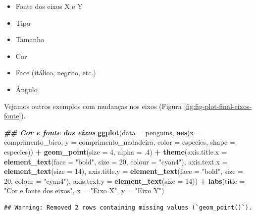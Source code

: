 \documentclass[
]{article}
\newenvironment{Shaded}{\begin{snugshade}}{\end{snugshade}}
\newcommand{\AttributeTok}[1]{\textcolor[rgb]{0.13,0.29,0.53}{#1}}
\newcommand{\DecValTok}[1]{\textcolor[rgb]{0.00,0.00,0.81}{#1}}
\newcommand{\DocumentationTok}[1]{\textcolor[rgb]{0.56,0.35,0.01}{\textbf{\textit{#1}}}}
\newcommand{\FunctionTok}[1]{\textcolor[rgb]{0.13,0.29,0.53}{\textbf{#1}}}
\newcommand{\NormalTok}[1]{#1}
\newcommand{\SpecialCharTok}[1]{\textcolor[rgb]{0.81,0.36,0.00}{\textbf{#1}}}
\newcommand{\StringTok}[1]{\textcolor[rgb]{0.31,0.60,0.02}{#1}}
\providecommand{\tightlist}{%
  \setlength{\itemsep}{0pt}\setlength{\parskip}{0pt}}
\begin{document}
\begin{itemize}
\tightlist
\item
  Fonte dos eixos X e Y
\item
  Tipo
\item
  Tamanho
\item
  Cor
\item
  Face (itálico, negrito, etc.)
\item
  Ângulo
\end{itemize}

Vejamos outros exemplos com mudanças nos eixos (Figura \ref{fig:fig-plot-final-eixos-fonte}).

\begin{Shaded}
\begin{Highlighting}[]
\DocumentationTok{\#\# Cor e fonte dos eixos}
\FunctionTok{ggplot}\NormalTok{(}\AttributeTok{data =}\NormalTok{ penguins, }
       \FunctionTok{aes}\NormalTok{(}\AttributeTok{x =}\NormalTok{ comprimento\_bico, }\AttributeTok{y =}\NormalTok{ comprimento\_nadadeira,}
           \AttributeTok{color =}\NormalTok{ especies, }\AttributeTok{shape =}\NormalTok{ especies)) }\SpecialCharTok{+}
    \FunctionTok{geom\_point}\NormalTok{(}\AttributeTok{size =} \DecValTok{4}\NormalTok{, }\AttributeTok{alpha =}\NormalTok{ .}\DecValTok{4}\NormalTok{) }\SpecialCharTok{+}
    \FunctionTok{theme}\NormalTok{(}\AttributeTok{axis.title.x =} \FunctionTok{element\_text}\NormalTok{(}\AttributeTok{face =} \StringTok{"bold"}\NormalTok{, }\AttributeTok{size =} \DecValTok{20}\NormalTok{, }\AttributeTok{colour =} \StringTok{"cyan4"}\NormalTok{),}
          \AttributeTok{axis.text.x =} \FunctionTok{element\_text}\NormalTok{(}\AttributeTok{size =} \DecValTok{14}\NormalTok{),}
          \AttributeTok{axis.title.y =} \FunctionTok{element\_text}\NormalTok{(}\AttributeTok{face =} \StringTok{"bold"}\NormalTok{, }\AttributeTok{size =} \DecValTok{20}\NormalTok{, }\AttributeTok{colour =} \StringTok{"cyan4"}\NormalTok{),}
          \AttributeTok{axis.text.y =} \FunctionTok{element\_text}\NormalTok{(}\AttributeTok{size =} \DecValTok{14}\NormalTok{)) }\SpecialCharTok{+}
    \FunctionTok{labs}\NormalTok{(}\AttributeTok{title =} \StringTok{"Cor e fonte dos eixos"}\NormalTok{, }\AttributeTok{x =} \StringTok{"Eixo X"}\NormalTok{, }\AttributeTok{y =} \StringTok{"Eixo Y"}\NormalTok{)}
\end{Highlighting}
\end{Shaded}

\begin{verbatim}
## Warning: Removed 2 rows containing missing values (`geom_point()`).
\end{verbatim}
\end{document}
